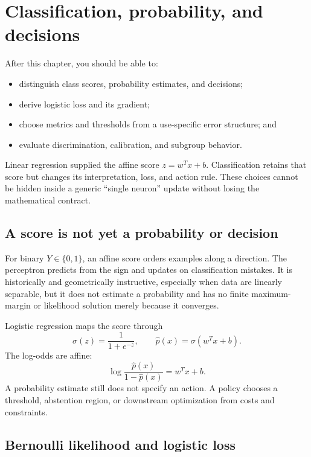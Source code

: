 \chapter{Classification, probability, and decisions}
\label{ch:classification}

\begin{learningobjectives}
After this chapter, you should be able to:
\begin{itemize}
  \item distinguish class scores, probability estimates, and decisions;
  \item derive logistic loss and its gradient;
  \item choose metrics and thresholds from a use-specific error structure; and
  \item evaluate discrimination, calibration, and subgroup behavior.
\end{itemize}
\end{learningobjectives}

\begin{chapterconnection}
Linear regression supplied the affine score $z=w^Tx+b$. Classification retains
that score but changes its interpretation, loss, and action rule. These choices
cannot be hidden inside a generic ``single neuron'' update without losing the
mathematical contract.
\end{chapterconnection}

\section{A score is not yet a probability or decision}

For binary $Y\in\{0,1\}$, an affine score orders examples along a direction.
The perceptron predicts from the sign and updates on classification mistakes.
It is historically and geometrically instructive, especially when data are
linearly separable, but it does not estimate a probability and has no finite
maximum-margin or likelihood solution merely because it converges.

Logistic regression maps the score through
\[
\sigma(z)=\frac{1}{1+e^{-z}},\qquad
\widehat p(x)=\sigma(w^Tx+b).
\]
The log-odds are affine:
\[
\log\frac{\widehat p(x)}{1-\widehat p(x)}=w^Tx+b.
\]
A probability estimate still does not specify an action. A policy chooses a
threshold, abstention region, or downstream optimization from costs and
constraints.

\section{Bernoulli likelihood and logistic loss}

